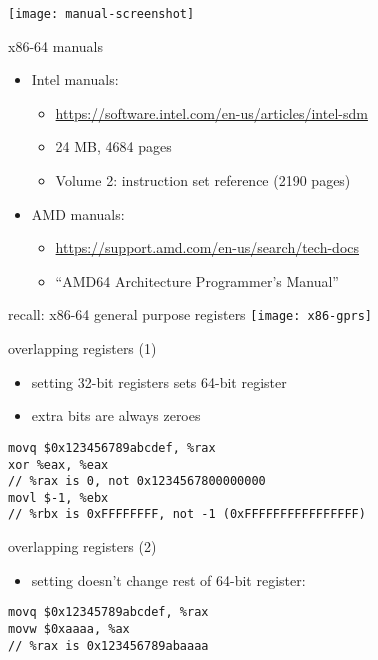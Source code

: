 \begin{frame}
\texttt{[image: manual-screenshot]}
\end{frame}

\begin{frame}{x86-64 manuals}
\begin{itemize}
\item Intel manuals:
    \begin{itemize}
    \item \small \url{https://software.intel.com/en-us/articles/intel-sdm}
    \item 24 MB, 4684 pages
    \item Volume 2: instruction set reference (2190 pages)
    \end{itemize}
\item AMD manuals:
    \begin{itemize}
    \item \small \url{https://support.amd.com/en-us/search/tech-docs}
    \item ``AMD64 Architecture Programmer's Manual''
    \end{itemize}
\end{itemize}
\end{frame}

\begin{frame}{recall: x86-64 general purpose registers}
\texttt{[image: x86-gprs]}
\end{frame}

\begin{frame}[fragile,label=overlap]{overlapping registers (1)}
\begin{itemize}
\item setting 32-bit registers sets  64-bit register
\item extra bits are always zeroes
\end{itemize}
\begin{lstlisting}[style=small]
movq $0x123456789abcdef, %rax
xor %eax, %eax
// %rax is 0, not 0x1234567800000000
movl $-1, %ebx
// %rbx is 0xFFFFFFFF, not -1 (0xFFFFFFFFFFFFFFFF)
\end{lstlisting}
\end{frame}

\begin{frame}[fragile,label=overlap2]{overlapping registers (2)}
\begin{itemize}
\item setting  doesn't change rest of 64-bit register:
\end{itemize}
\begin{lstlisting}[style=small]
movq $0x12345789abcdef, %rax
movw $0xaaaa, %ax
// %rax is 0x123456789abaaaa
\end{lstlisting}
\end{frame}

